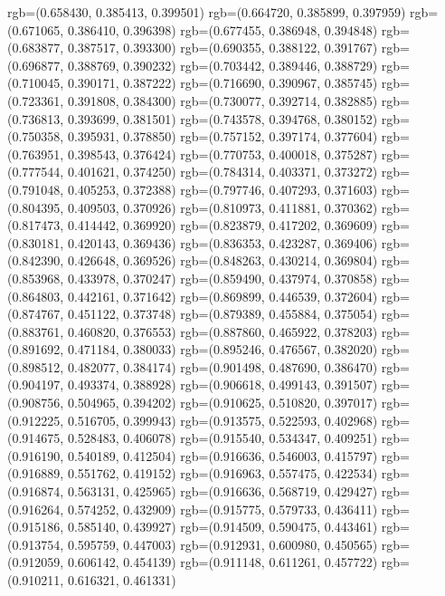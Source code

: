 {{{					rgb=(0.658430, 0.385413, 0.399501)
					rgb=(0.664720, 0.385899, 0.397959)
					rgb=(0.671065, 0.386410, 0.396398)
					rgb=(0.677455, 0.386948, 0.394848)
					rgb=(0.683877, 0.387517, 0.393300)
					rgb=(0.690355, 0.388122, 0.391767)
					rgb=(0.696877, 0.388769, 0.390232)
					rgb=(0.703442, 0.389446, 0.388729)
					rgb=(0.710045, 0.390171, 0.387222)
					rgb=(0.716690, 0.390967, 0.385745)
					rgb=(0.723361, 0.391808, 0.384300)
					rgb=(0.730077, 0.392714, 0.382885)
					rgb=(0.736813, 0.393699, 0.381501)
					rgb=(0.743578, 0.394768, 0.380152)
					rgb=(0.750358, 0.395931, 0.378850)
					rgb=(0.757152, 0.397174, 0.377604)
					rgb=(0.763951, 0.398543, 0.376424)
					rgb=(0.770753, 0.400018, 0.375287)
					rgb=(0.777544, 0.401621, 0.374250)
					rgb=(0.784314, 0.403371, 0.373272)
					rgb=(0.791048, 0.405253, 0.372388)
					rgb=(0.797746, 0.407293, 0.371603)
					rgb=(0.804395, 0.409503, 0.370926)
					rgb=(0.810973, 0.411881, 0.370362)
					rgb=(0.817473, 0.414442, 0.369920)
					rgb=(0.823879, 0.417202, 0.369609)
					rgb=(0.830181, 0.420143, 0.369436)
					rgb=(0.836353, 0.423287, 0.369406)
					rgb=(0.842390, 0.426648, 0.369526)
					rgb=(0.848263, 0.430214, 0.369804)
					rgb=(0.853968, 0.433978, 0.370247)
					rgb=(0.859490, 0.437974, 0.370858)
					rgb=(0.864803, 0.442161, 0.371642)
					rgb=(0.869899, 0.446539, 0.372604)
					rgb=(0.874767, 0.451122, 0.373748)
					rgb=(0.879389, 0.455884, 0.375054)
					rgb=(0.883761, 0.460820, 0.376553)
					rgb=(0.887860, 0.465922, 0.378203)
					rgb=(0.891692, 0.471184, 0.380033)
					rgb=(0.895246, 0.476567, 0.382020)
					rgb=(0.898512, 0.482077, 0.384174)
					rgb=(0.901498, 0.487690, 0.386470)
					rgb=(0.904197, 0.493374, 0.388928)
					rgb=(0.906618, 0.499143, 0.391507)
					rgb=(0.908756, 0.504965, 0.394202)
					rgb=(0.910625, 0.510820, 0.397017)
					rgb=(0.912225, 0.516705, 0.399943)
					rgb=(0.913575, 0.522593, 0.402968)
					rgb=(0.914675, 0.528483, 0.406078)
					rgb=(0.915540, 0.534347, 0.409251)
					rgb=(0.916190, 0.540189, 0.412504)
					rgb=(0.916636, 0.546003, 0.415797)
					rgb=(0.916889, 0.551762, 0.419152)
					rgb=(0.916963, 0.557475, 0.422534)
					rgb=(0.916874, 0.563131, 0.425965)
					rgb=(0.916636, 0.568719, 0.429427)
					rgb=(0.916264, 0.574252, 0.432909)
					rgb=(0.915775, 0.579733, 0.436411)
					rgb=(0.915186, 0.585140, 0.439927)
					rgb=(0.914509, 0.590475, 0.443461)
					rgb=(0.913754, 0.595759, 0.447003)
					rgb=(0.912931, 0.600980, 0.450565)
					rgb=(0.912059, 0.606142, 0.454139)
					rgb=(0.911148, 0.611261, 0.457722)
					rgb=(0.910211, 0.616321, 0.461331)
}}}
